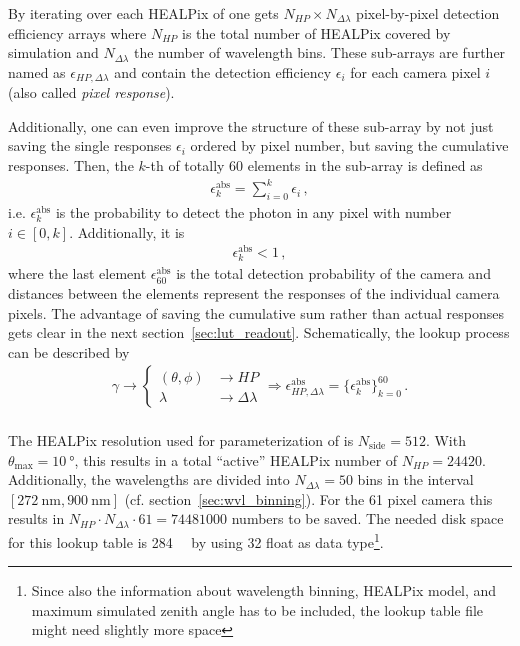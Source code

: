 By iterating over each HEALPix of one gets $N_{HP}\times N_{\Delta\lambda}$ pixel-by-pixel detection efficiency arrays where $N_{HP}$ is the total number of HEALPix covered by simulation and $N_{\Delta\lambda}$ the number of wavelength bins. These sub-arrays are further named as $\epsilon_{HP,\Delta\lambda}$ and contain the detection efficiency $\epsilon_i$ for each camera pixel $i$ (also called \textit{pixel response}). 

Additionally, one can even improve the structure of these sub-array by not just saving the single responses $\epsilon_i$ ordered by pixel number, but saving the cumulative responses. Then, the $k$-th of totally \num{60} elements in the sub-array is defined as 
\begin{align}
	\epsilon^\text{abs}_k = \sum_{i=0}^{k} \epsilon_i\,,
	\label{eq:eps_cumulative}
\end{align}
i.e. $\epsilon^\text{abs}_k$ is the probability to detect the photon in any pixel with number $i\in[0,k]$. Additionally, it is
\begin{align}
\epsilon_k^\text{abs} < 1\,,
\end{align}
where the last element $\epsilon_{60}^\text{abs}$ is the total detection probability of the camera and distances between the elements represent the responses of the individual camera pixels. The advantage of saving the cumulative sum rather than actual responses gets clear in the next section~\ref{sec:lut_readout}. Schematically, the lookup process can be described by
\begin{align}
	\gamma \rightarrow
	\begin{cases}
		(\theta,\phi) & \rightarrow HP\\
		\lambda & \rightarrow \Delta\lambda
	\end{cases}
	\Rightarrow \epsilon^\text{abs}_{HP,\Delta\lambda} = \{\epsilon^\text{abs}_k\}_{k=0}^{60}\,.
\end{align}\\

The HEALPix resolution used for parameterization of \iceact is $N_\text{side}=\num{512}$. With $\theta_\text{max}=\SI{10}{\degree}$, this results in a total \enquote{active} HEALPix number of $N_{HP}=\num{24420}$. Additionally, the wavelengths are divided into $N_{\Delta\lambda} = \num{50}$ bins in the interval $[\SI{272}{\nano\meter},\SI{900}{\nano\meter}]$ (cf. section~\ref{sec:wvl_binning}). For the \num{61} pixel camera this results in $N_{HP}\cdot N_{\Delta\lambda}\cdot \num{61} = \num{74481000}$ numbers to be saved. The needed disk space for this lookup table is \SI{284}{\mebi\byte} by using \SI{32}{\bit} float as data type\footnote{Since also the information about wavelength binning, HEALPix model, and maximum simulated zenith angle has to be included, the lookup table file might need slightly more space}.


